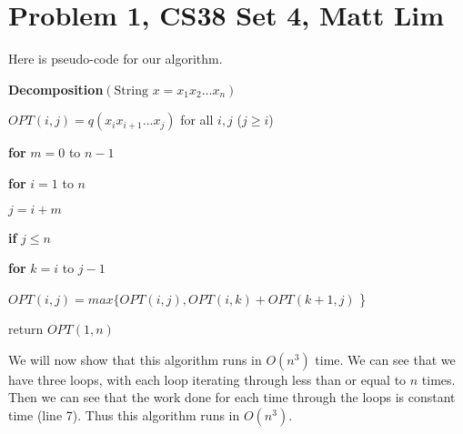 \documentclass{article}
\begin{document}
\section*{Problem 1, CS38 Set 4, Matt Lim}
Here is pseudo-code for our algorithm.

\vspace{5mm}
\noindent \textbf{Decomposition}$(\text{String } x = x_1x_2 \dots x_n)$
\begin{enumerate}
    \item $OPT(i,j) = q(x_ix_{i+1} \dots x_j)$ for all $i,j$ ($j \ge i$)
    \item \textbf{for} $m=0$ to $n-1$
    {\setlength\itemindent{25pt} \item \textbf{for} $i=1$ to $n$ }
    {\setlength\itemindent{50pt} \item $j = i+m$ }
    {\setlength\itemindent{50pt} \item \textbf{if} $j \le n$ }
    {\setlength\itemindent{75pt} \item \textbf{for} $k=i$ to $j-1$ }
    {\setlength\itemindent{100pt} \item $OPT(i,j) = max\{OPT(i,j),OPT(i,k) +
        OPT(k+1,j)$ \} }
    \item return $OPT(1,n)$
\end{enumerate}

\vspace{5mm}
We will now show that this algorithm runs in $O(n^3)$ time. We can see that we
have three loops, with each loop iterating through less than or equal to $n$
times. Then we can see that the work done for each time through the loops is
constant time (line 7). Thus this algorithm runs in $O(n^3)$.
\end{document}
